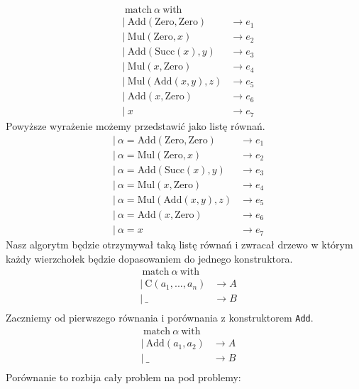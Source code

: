 \documentclass{article}
\begin{document}
\begin{align*}
   & \ \text{match}\ \alpha\ \text{with}                       \\
   & |\ \text{Add}(\text{Zero}, \text{Zero}) & \rightarrow e_1 \\
   & |\ \text{Mul}(\text{Zero}, x)           & \rightarrow e_2 \\
   & |\ \text{Add}(\text{Succ}(x), y)        & \rightarrow e_3 \\
   & |\ \text{Mul}(x, \text{Zero})           & \rightarrow e_4 \\
   & |\ \text{Mul}(\text{Add}(x,y), z)       & \rightarrow e_5 \\
   & |\ \text{Add}(x,\text{Zero})            & \rightarrow e_6 \\
   & |\ x                                    & \rightarrow e_7
\end{align*}
Powyższe wyrażenie możemy przedstawić jako listę równań.
\begin{align*}
   & |\ \alpha = \text{Add}(\text{Zero}, \text{Zero}) & \rightarrow e_1 \\
   & |\ \alpha = \text{Mul}(\text{Zero}, x)           & \rightarrow e_2 \\
   & |\ \alpha = \text{Add}(\text{Succ}(x), y)        & \rightarrow e_3 \\
   & |\ \alpha = \text{Mul}(x, \text{Zero})           & \rightarrow e_4 \\
   & |\ \alpha = \text{Mul}(\text{Add}(x,y), z)       & \rightarrow e_5 \\
   & |\ \alpha = \text{Add}(x,\text{Zero})            & \rightarrow e_6 \\
   & |\ \alpha = x                                    & \rightarrow e_7
\end{align*}
Nasz algorytm będzie otrzymywał taką listę równań i zwracał drzewo w którym każdy wierzchołek będzie dopasowaniem do jednego konstruktora.
\begin{align*}
   & \ \text{match}\ \alpha\ \text{with}                 \\
   & |\  \text{C}(a_1,..., a_n)          & \rightarrow A \\
   & |\ \_                               & \rightarrow B \\
\end{align*}
Zaczniemy od pierwszego równania i porównania z konstruktorem \lstinline$Add$.
\begin{align*}
   & \ \text{match}\ \alpha\ \text{with}                 \\
   & |\  \text{Add}(a_1, a_2)            & \rightarrow A \\
   & |\ \_                               & \rightarrow B \\
\end{align*}
Porównanie to rozbija cały problem na pod problemy:
\end{document}
